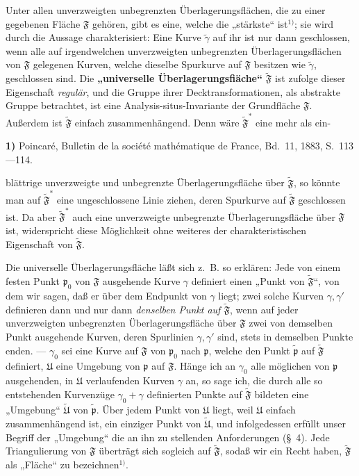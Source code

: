 \documentclass{article}
\begin{document}
Unter allen unverzweigten unbegrenzten Überlagerungsflächen, die zu einer gegebenen Fläche $\mathfrak{F}$ gehören, gibt es eine, welche die „stärkste“ ist${}^{1)}$; sie wird durch die Aussage charakterisiert: Eine Kurve $\tilde{\gamma}$ auf ihr ist nur dann geschlossen, wenn alle auf irgendwelchen unverzweigten unbegrenzten Überlagerungsflächen von $\mathfrak{F}$ gelegenen Kurven, welche dieselbe Spurkurve auf $\mathfrak{F}$ besitzen wie $\tilde{\gamma}$, geschlossen sind. Die \textbf{„universelle Überlagerungsfiäche“} $\tilde{\mathfrak{F}}$ ist zufolge dieser Eigenschaft \emph{regulär}, und die Gruppe ihrer Decktransformationen, als abstrakte Gruppe betrachtet, ist eine Analysis-situs-Invariante der Grundfläche $\mathfrak{F}$. Außerdem ist $\tilde{\mathfrak{F}}$ einfach zusammenhängend. Denn wäre $\tilde{\mathfrak{F}}^*$ eine mehr als ein-

\textbf{1)} Poincaré, Bulletin de la société mathématique de France, Bd.\ 11, 1883, S.\ 113---114.

blättrige unverzweigte und unbegrenzte Überlagerungsfläche über $\tilde{\mathfrak{F}}$, so könnte man auf $\tilde{\mathfrak{F}}^*$ eine ungeschlossene Linie ziehen, deren Spurkurve auf $\tilde{\mathfrak{F}}$ geschlossen ist. Da aber $\tilde{\mathfrak{F}}^*$ auch eine unverzweigte unbegrenzte Überlagerungsfläche über $\mathfrak{F}$ ist, widerspricht diese Möglichkeit ohne weiteres der charakteristischen Eigenschaft von $\tilde{\mathfrak{F}}$.

Die universelle Überlagerungsfläche läßt sich z.~B. so erklären: Jede von einem festen Punkt $\mathfrak{p}_0$ von $\mathfrak{F}$ ausgehende Kurve $\gamma$ definiert einen „Punkt von $\tilde{\mathfrak{F}}$“, von dem wir sagen, daß er über dem Endpunkt von $\gamma$ liegt; zwei solche Kurven $\gamma, \gamma'$ definieren dann und nur dann \emph{denselben Punkt auf $\tilde{\mathfrak{F}}$}, wenn auf jeder unverzweigten unbegrenzten Überlagerungsfläche über $\mathfrak{F}$ zwei von demselben Punkt ausgehende Kurven, deren Spurlinien $\gamma, \gamma'$ sind, stets in demselben Punkte enden. --- $\gamma_0$ sei eine Kurve auf $\mathfrak{F}$ von $\mathfrak{p}_0$ nach $\mathfrak{p}$, welche den Punkt $\tilde{\mathfrak{p}}$ auf $\tilde{\mathfrak{F}}$ definiert, $\mathfrak{U}$ eine Umgebung von $\mathfrak{p}$ auf $\mathfrak{F}$. Hänge ich an $\gamma_0$ alle möglichen von $\mathfrak{p}$ ausgehenden, in $\mathfrak{U}$ verlaufenden Kurven $\gamma$ an, so sage ich, die durch alle so entstehenden Kurvenzüge $\gamma_0 + \gamma$ definierten Punkte auf $\tilde{\mathfrak{F}}$ bildeten eine „Umgebung“ $\tilde{\mathfrak{U}}$ von $\tilde{\mathfrak{p}}$. Über jedem Punkt von $\mathfrak{U}$ liegt, weil $\mathfrak{U}$ einfach zusammenhängend ist, ein einziger Punkt von $\tilde{\mathfrak{U}}$, und infolgedessen erfüllt unser Begriff der „Umgebung“ die an ihn zu stellenden Anforderungen (§~4). Jede Triangulierung von $\mathfrak{F}$ überträgt sich sogleich auf $\tilde{\mathfrak{F}}$, sodaß wir ein Recht haben, $\tilde{\mathfrak{F}}$ als „Fläche“ zu bezeichnen${}^{1)}$.
\end{document}
